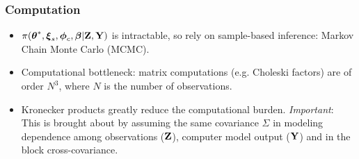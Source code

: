 \documentclass{beamer}
\begin{document}
\begin{frame}
  \frametitle{Computation}
    \begin{itemize}
    \item $\pi(\mbox{\boldmath $\theta$}^*,\mbox{\boldmath $\xi$}_{s},\mbox{\boldmath $\phi$}_c,\mbox{\boldmath $\beta$} |{\bf Z},{\bf Y})$ is intractable, so rely on sample-based inference: Markov Chain Monte Carlo (MCMC).
  \item Computational bottleneck: matrix computations (e.g. Choleski
    factors) are of order $N^3$, where $N$ is the number of
    observations.
  \item Kronecker products greatly reduce the computational burden.
    {\it Important}: This is brought about by assuming the same
    covariance $\Sigma$ in modeling dependence among observations
    (${\bf Z}$), computer model output (${\bf Y}$) and in the block
    cross-covariance.%
\end{itemize}
\end{frame}

 

\end{document}
